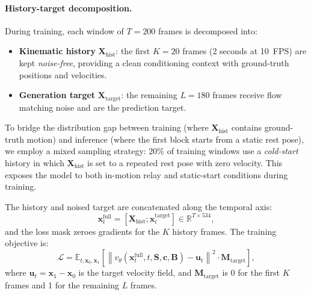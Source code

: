 \documentclass[sigconf, screen, review, anonymous]{acmart}
\begin{document}
\paragraph{History-target decomposition.}
During training, each window of $T{=}200$ frames is decomposed into:
\begin{itemize}
    \item \textbf{Kinematic history} $\mathbf{X}_{\text{hist}}$: the first $K{=}20$ frames (2 seconds at 10~FPS) are kept \emph{noise-free}, providing a clean conditioning context with ground-truth positions and velocities.
    \item \textbf{Generation target} $\mathbf{X}_{\text{target}}$: the remaining $L{=}180$ frames receive flow matching noise and are the prediction target.
\end{itemize}
To bridge the distribution gap between training (where $\mathbf{X}_{\text{hist}}$ contains ground-truth motion) and inference (where the first block starts from a static rest pose), we employ a mixed sampling strategy: 20\% of training windows use a \emph{cold-start} history in which $\mathbf{X}_{\text{hist}}$ is set to a repeated rest pose with zero velocity. This exposes the model to both in-motion relay and static-start conditions during training.

The history and noised target are concatenated along the temporal axis:
\begin{equation}
    \mathbf{x}_t^{\text{full}} = [\mathbf{X}_{\text{hist}}; \mathbf{x}_t^{\text{target}}] \in \mathbb{R}^{T \times 534},
    \label{eq:autoreg_concat}
\end{equation}
and the loss mask zeroes gradients for the $K$ history frames. The training objective is:
\begin{equation}
    \mathcal{L} = \mathbb{E}_{t, \mathbf{x}_0, \mathbf{x}_1}\left[\left\| v_\theta(\mathbf{x}_t^{\text{full}}, t, \mathbf{S}, \mathbf{c}, \mathbf{B}) - \mathbf{u}_t \right\|^2 \cdot \mathbf{M}_{\text{target}}\right],
    \label{eq:autoreg_loss}
\end{equation}
where $\mathbf{u}_t = \mathbf{x}_1 - \mathbf{x}_0$ is the target velocity field, and $\mathbf{M}_{\text{target}}$ is 0 for the first $K$ frames and 1 for the remaining $L$ frames. 
\end{document}
